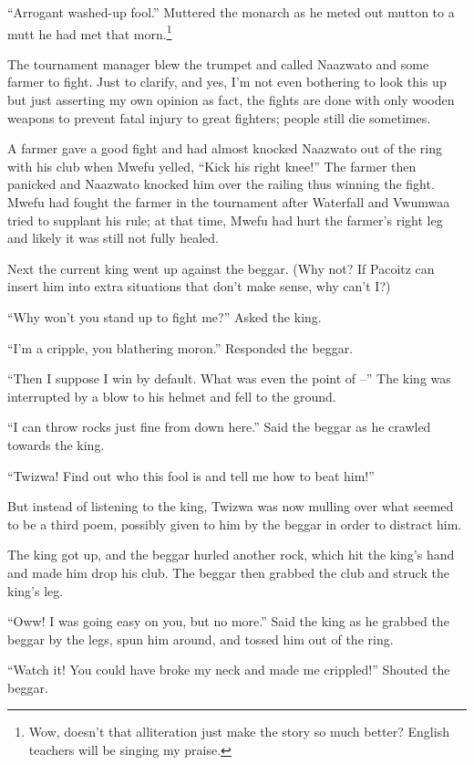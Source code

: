 ``Arrogant washed-up fool.'' Muttered the monarch as he meted out mutton to a mutt he had met that morn.\footnote{Wow, doesn't that alliteration just make the story so much better? English teachers will be singing my praise.}

\tbreak

The tournament manager blew the trumpet and called Naazwato and some farmer to fight. Just to clarify, and yes, I'm not even bothering to look this up but just asserting my own opinion as fact, the fights are done with only wooden weapons to prevent fatal injury to great fighters; people still die sometimes.

A farmer gave a good fight and had almost knocked Naazwato out of the ring with his club when Mwefu yelled, ``Kick his right knee!'' The farmer then panicked and Naazwato knocked him over the railing thus winning the fight. Mwefu had fought the farmer in the tournament after Waterfall and Vwumwaa tried to supplant his rule; at that time, Mwefu had hurt the farmer's right leg and likely it was still not fully healed. 

Next the current king went up against the beggar. (Why not? If Pacoitz can insert him into extra situations that don't make sense, why can't I?)

``Why won't you stand up to fight me?'' Asked the king.

``I'm a cripple, you blathering moron.'' Responded the beggar.

``Then I suppose I win by default. What was even the point of --'' The king was interrupted by a blow to his helmet and fell to the ground.

``I can throw rocks just fine from down here.'' Said the beggar as he crawled towards the king.

``Twizwa! Find out who this fool is and tell me how to beat him!''

But instead of listening to the king, Twizwa was now mulling over what seemed to be a third poem, possibly given to him by the beggar in order to distract him.

The king got up, and the beggar hurled another rock, which hit the king's hand and made him drop his club. The beggar then grabbed the club and struck the king's leg.

``Oww! I was going easy on you, but no more.'' Said the king as he grabbed the beggar by the legs, spun him around, and tossed him out of the ring.

``Watch it! You could have broke my neck and made me crippled!'' Shouted the beggar.

